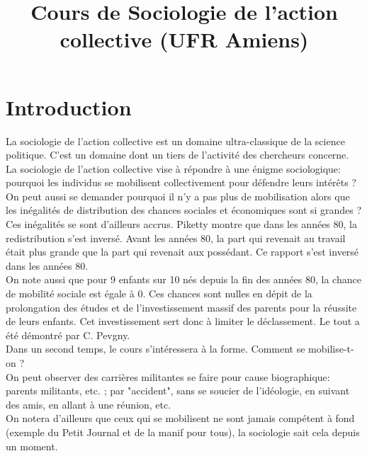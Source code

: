 \documentclass[10pt, a4paper, openany]{book}
\date{}
\title{Cours de Sociologie de l'action collective (UFR Amiens)}
\begin{document}
\maketitle
\tableofcontents


\chapter{Introduction}

La sociologie de l'action collective est un domaine ultra-classique de la science politique. C'est un domaine dont un tiers de l'activité des chercheurs concerne. \\
La sociologie de l'action collective vise à répondre à une énigme sociologique: pourquoi les individus se mobilisent collectivement pour défendre leurs intérêts ? On peut aussi se demander pourquoi il n'y a pas plus de mobilisation alors que les inégalités de distribution des chances sociales et économiques sont si grandes ? Ces inégalités se sont d'ailleurs accrus. Piketty montre que dans les années 80, la redistribution s'est inversé. Avant les années 80, la part qui revenait au travail était plus grande que la part qui revenait aux possédant. Ce rapport s'est inversé dans les années 80. \\
On note aussi que pour 9 enfants sur 10 nés depuis la fin des années 80, la chance de mobilité sociale est égale à 0. Ces chances sont nulles en dépit de la prolongation des études et de l'investissement massif des parents pour la réussite de leurs enfants. Cet investissement sert donc à limiter le déclassement. Le tout a été démontré par C. Pevgny.  \\
Dans un second temps, le cours s'intéressera à la forme. Comment se mobilise-t-on ? \\
On peut observer des carrières militantes se faire pour cause biographique: parents militants, etc. ; par "accident", sans se soucier de l'idéologie, en suivant des amis, en allant à une réunion, etc. \\
On notera d'ailleurs que ceux qui se mobilisent ne sont jamais compétent à fond (exemple du Petit Journal et de la manif pour tous), la sociologie sait cela depuis un moment. 
\end{document}
